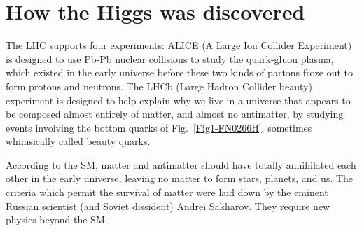 \documentclass[12pt]{iopart}
\begin{document}
\section{\label{sec:sec5} How the Higgs was discovered}

The LHC supports four experiments: ALICE (A Large Ion Collider Experiment) is designed to use Pb-Pb nuclear collisions to study the quark-gluon plasma, which existed in the early universe before these two kinds of partons froze out to form protons and neutrons. The LHCb (Large Hadron Collider beauty) experiment is designed to help explain why we live in a universe that appears to be composed almost entirely of matter, and almost no antimatter, by studying events involving the bottom quarks of Fig.~\ref{Fig1-FN0266H}, sometimes whimsically called beauty quarks. 

According to the SM, matter and antimatter should have totally annihilated each other in the early universe, leaving no matter to form stars, planets, and us. The criteria which permit the survival of matter were laid down by the eminent Russian scientist (and Soviet dissident) Andrei Sakharov. They require new physics beyond the SM.
\end{document}
